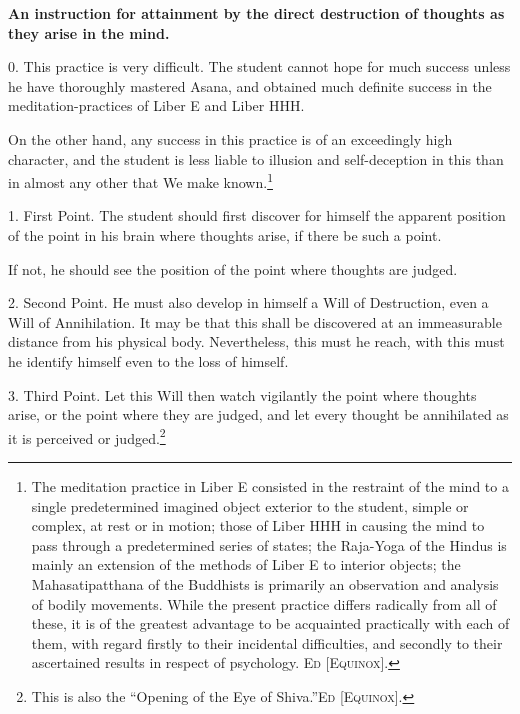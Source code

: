 
\textbf{An instruction for attainment by the direct destruction of thoughts as they arise in the mind.}

0. This practice is very difficult. The student cannot hope for much success unless he have thoroughly mastered Asana, and obtained much definite success in the meditation-practices of Liber E and Liber HHH.

On the other hand, any success in this practice is of an exceedingly high character, and the student is less liable to illusion and self-deception in this than in almost any other that We make known.\footnote{The meditation practice in Liber E consisted in the restraint of the mind to a single predetermined imagined object exterior to the student, simple or complex, at rest or in motion; those of Liber HHH in causing the mind to pass through a predetermined series of states; the Raja-Yoga of the Hindus is mainly an extension of the methods of Liber E to interior objects; the Mahasatipatthana of the Buddhists is primarily an observation and analysis of bodily movements. While the present practice differs radically from all of these, it is of the greatest advantage to be acquainted practically with each of them, with regard firstly to their incidental difficulties, and secondly to their ascertained results in respect of psychology. \textsc{Ed [Equinox]}.}

1. First Point. The student should first discover for himself the apparent position of the point in his brain where thoughts arise, if there be such a point.

If not, he should see the position of the point where thoughts are judged.

2. Second Point. He must also develop in himself a Will of Destruction, even a Will of Annihilation. It may be that this shall be discovered at an immeasurable distance from his physical body. Nevertheless, this must he reach, with this must he identify himself even to the loss of himself.

3. Third Point. Let this Will then watch vigilantly the point where thoughts arise, or the point where they are judged, and let every thought be annihilated as it is perceived or judged.\footnote{This is also the \enquote{Opening of the Eye of Shiva.}\footnotemark \textsc{Ed [Equinox]}.}

